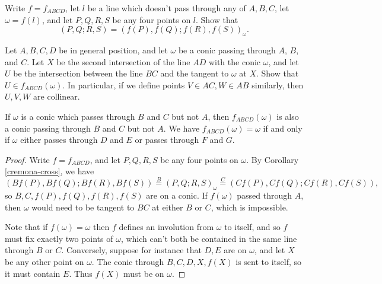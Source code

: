 \begin{exer}  Write $f = f_{ABCD}$, let $l$ be a line which doesn't pass through any of $A,B,C$, let $\omega = f(l)$, and let $P,Q,R,S$ be any four points on $l$. Show that
\[
(P,Q;R,S) = (f(P),f(Q);f(R),f(S))_\omega.
\]
\end{exer}

\begin{exer} Let $A,B,C,D$ be in general position, and let $\omega$ be a conic passing through $A$, $B$, and $C$. Let $X$ be the second intersection of the line $AD$ with the conic $\omega$, and let $U$ be the intersection between the line $BC$ and the tangent to $\omega$ at $X$. Show that $U \in f_{ABCD}(\omega)$. In particular, if we define points $V \in AC, W \in AB$ similarly, then $U,V,W$ are collinear.
\end{exer}

\begin{thm}\label{cremona-two} If $\omega$ is a conic which passes through $B$ and $C$ but not $A$, then $f_{ABCD}(\omega)$ is also a conic passing through $B$ and $C$ but not $A$. We have $f_{ABCD}(\omega) = \omega$ if and only if $\omega$ either passes through $D$ and $E$ or passes through $F$ and $G$.
\end{thm}
\begin{proof} Write $f = f_{ABCD}$, and let $P,Q,R,S$ be any four points on $\omega$. By Corollary \ref{cremona-cross}, we have
\[
(Bf(P),Bf(Q);Bf(R),Bf(S)) \stackrel{B}{=} (P,Q;R,S)_\omega \stackrel{C}{=} (Cf(P),Cf(Q);Cf(R),Cf(S)),
\]
so $B,C,f(P),f(Q),f(R),f(S)$ are on a conic. If $f(\omega)$ passed through $A$, then $\omega$ would need to be tangent to $BC$ at either $B$ or $C$, which is impossible.

Note that if $f(\omega) = \omega$ then $f$ defines an involution from $\omega$ to itself, and so $f$ must fix exactly two points of $\omega$, which can't both be contained in the same line through $B$ or $C$. Conversely, suppose for instance that $D,E$ are on $\omega$, and let $X$ be any other point on $\omega$. The conic through $B,C,D,X,f(X)$ is sent to itself, so it must contain $E$. Thus $f(X)$ must be on $\omega$.
\end{proof}


